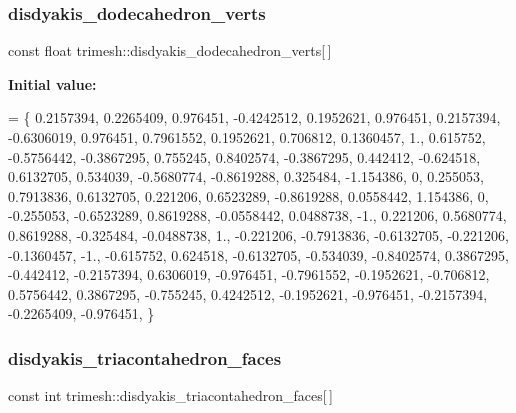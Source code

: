 \subsubsection{\texorpdfstring{disdyakis\+\_\+dodecahedron\+\_\+verts}{disdyakis\_dodecahedron\_verts}}
{\footnotesize\ttfamily const float trimesh\+::disdyakis\+\_\+dodecahedron\+\_\+verts\mbox{[}$\,$\mbox{]}\hspace{0.3cm}{\ttfamily [static]}}

{\bfseries Initial value\+:}
\begin{DoxyCode}
= \{
    0.2157394, 0.2265409, 0.976451,
    -0.4242512, 0.1952621, 0.976451,
    0.2157394, -0.6306019, 0.976451,
    0.7961552, 0.1952621, 0.706812,
    0.1360457, 1., 0.615752,
    -0.5756442, -0.3867295, 0.755245,
    0.8402574, -0.3867295, 0.442412,
    -0.624518, 0.6132705, 0.534039,
    -0.5680774, -0.8619288, 0.325484,
    -1.154386, 0, 0.255053,
    0.7913836, 0.6132705, 0.221206,
    0.6523289, -0.8619288, 0.0558442,
    1.154386, 0, -0.255053,
    -0.6523289, 0.8619288, -0.0558442,
    0.0488738, -1., 0.221206,
    0.5680774, 0.8619288, -0.325484,
    -0.0488738, 1., -0.221206,
    -0.7913836, -0.6132705, -0.221206,
    -0.1360457, -1., -0.615752,
    0.624518, -0.6132705, -0.534039,
    -0.8402574, 0.3867295, -0.442412,
    -0.2157394, 0.6306019, -0.976451,
    -0.7961552, -0.1952621, -0.706812,
    0.5756442, 0.3867295, -0.755245,
    0.4242512, -0.1952621, -0.976451,
    -0.2157394, -0.2265409, -0.976451,
\}
\end{DoxyCode}
\mbox{\label{namespacetrimesh_a5f0bf3f2c7a228af1c3a8b59e25fec5b}} 
\subsubsection{\texorpdfstring{disdyakis\+\_\+triacontahedron\+\_\+faces}{disdyakis\_triacontahedron\_faces}}
{\footnotesize\ttfamily const int trimesh\+::disdyakis\+\_\+triacontahedron\+\_\+faces\mbox{[}$\,$\mbox{]}\hspace{0.3cm}{\ttfamily [static]}}

\mbox{\label{namespacetrimesh_a7f451a634e9ac00cfe8d84526662d2fd}} 
